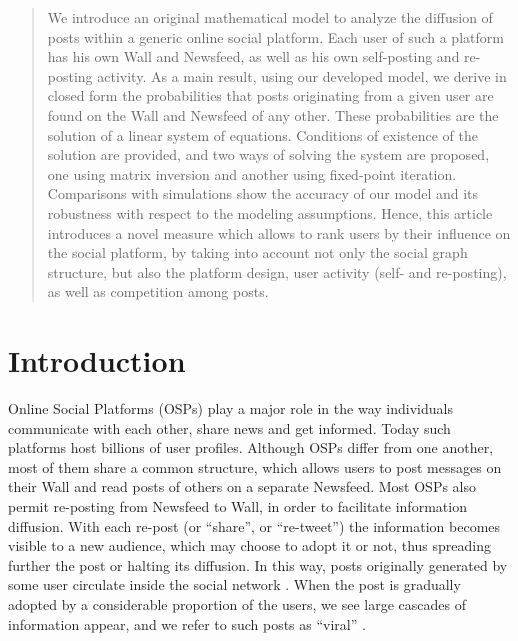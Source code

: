 \documentclass[10pt, conference, letterpaper]{IEEEtran}
\newcommand{\blue}[1]{\textcolor{blue}{#1}}
\begin{document}
\begin{abstract}
We introduce an original mathematical model to analyze the diffusion of posts within a generic online social platform. Each user of such a platform has his own Wall and Newsfeed, as well as his own self-posting and re-posting activity. 
As a main result, using our developed model, we derive in closed form the probabilities that posts originating from a given user are found on the Wall and Newsfeed of any other. These probabilities are the solution of a linear system of equations. Conditions of existence of the solution are provided, and two ways of solving the system are proposed, one using matrix inversion and another using fixed-point iteration. Comparisons with simulations show the accuracy of our model and its robustness with respect to the modeling assumptions. %
Hence, this article introduces a novel measure which allows to rank users by their influence on the social platform, by taking into account not only the social graph structure, but also the platform design, user activity (self- and re-posting), as well as competition among posts.
\end{abstract}




\section{Introduction}


Online Social Platforms (OSPs) play a major role in the way individuals communicate with each other, share news and  get informed. Today such platforms host billions of user profiles. Although OSPs differ from one another, most of them share a common structure, which allows users to post messages on their Wall and read posts of others on a separate Newsfeed. Most OSPs also permit re-posting from Newsfeed to Wall, in order to facilitate information diffusion. With each re-post (or ``share'', or ``re-tweet'') the information becomes visible to a new audience, which may choose to adopt it or not, thus spreading further the post or halting its diffusion. In this way, posts originally generated by some user circulate inside the social network \cite{EC2012}. When the post is gradually adopted by a considerable proportion of the users, we see large cascades of information appear, and we refer to such posts as ``viral'' \cite{Adamic2013}.
\end{document}
